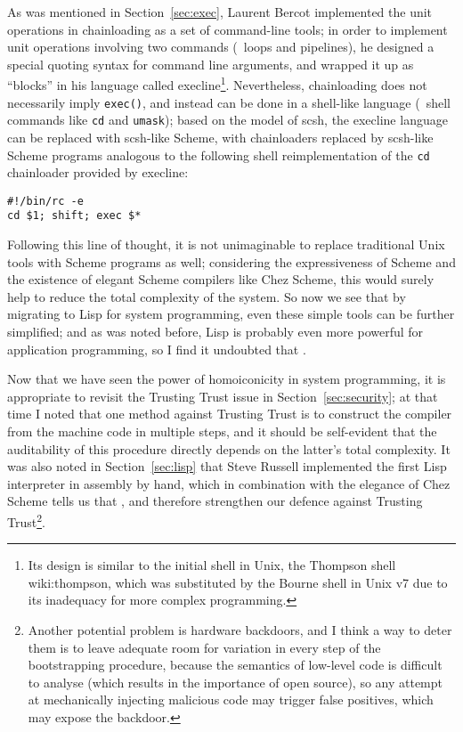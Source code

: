 As was mentioned in Section~\ref{sec:exec}, Laurent Bercot implemented the unit
operations in chainloading as a set of command-line tools; in order to implement
unit operations involving two commands (\eg~loops and pipelines), he designed
a special quoting syntax for command line arguments, and wrapped it up as
``blocks'' in his language called execline\footnote{Its
design is similar to the initial shell in Unix, the Thompson shell\cupercite%
{wiki:thompson}, which was substituted by the Bourne shell in Unix v7 due to
its inadequacy for more complex programming.}.  Nevertheless, chainloading
does not necessarily imply \verb|exec()|, and instead can be done in a
shell-like language (\cf~shell commands like \verb|cd|
and \verb|umask|); based on the model of scsh, the execline
language can be replaced with scsh-like Scheme, with chainloaders replaced by
scsh-like Scheme programs analogous to the following shell reimplementation of
the \verb|cd| chainloader provided by execline:
\begin{wquoting}
\begin{Verbatim}
#!/bin/rc -e
cd $1; shift; exec $*
\end{Verbatim}
\end{wquoting}

Following this line of thought, it is not unimaginable to replace traditional
Unix tools with Scheme programs as well; considering the expressiveness of
Scheme and the existence of elegant Scheme compilers like Chez Scheme, this
would surely help to reduce the total complexity of the system.  So now we
see that by migrating to Lisp for system programming, even these simple
tools can be further simplified; and as was noted before, Lisp is probably
even more powerful for application programming, so I find it undoubted
that .

Now that we have seen the power of homoiconicity in system programming, it is
appropriate to revisit the Trusting Trust issue in Section~\ref{sec:security};
at that time I noted that one method against Trusting Trust is to construct the
compiler from the machine code in multiple steps, and it should be self-evident
that the auditability of this procedure directly depends on the latter's total
complexity.  It was also noted in Section~\ref{sec:lisp} that Steve Russell
implemented the first Lisp interpreter in assembly by hand, which in combination
with the elegance of Chez Scheme tells us that ,
and therefore strengthen our defence against Trusting Trust\footnote{Another
potential problem is hardware backdoors, and I think a way to deter them is to
leave adequate room for variation in every step of the bootstrapping procedure,
because the semantics of low-level code is difficult to analyse (which results
in the importance of open source), so any attempt at mechanically injecting
malicious code may trigger false positives, which may expose the backdoor.}.

